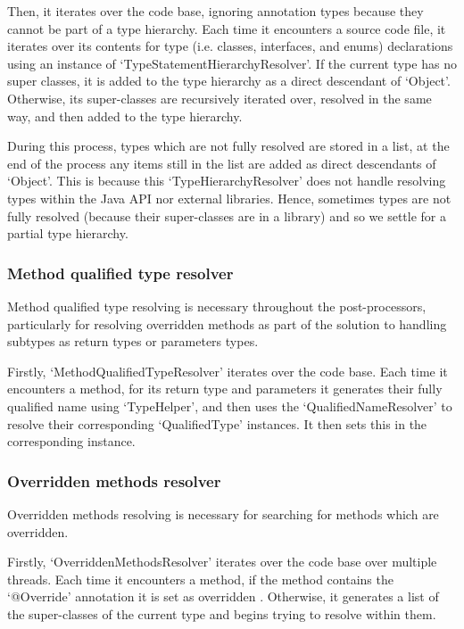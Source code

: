 \documentclass[12pt, letterpaper]{article}
\begin{document}
Then, it iterates over the code base, ignoring annotation types because they cannot be part of a type hierarchy.
Each time it encounters a source code file, it iterates over its contents for type (i.e. classes, interfaces, and enums) declarations using an instance of `TypeStatementHierarchyResolver'.
If the current type has no super classes, it is added to the type hierarchy as a direct descendant of `Object'.
Otherwise, its super-classes are recursively iterated over, resolved in the same way, and then added to the type hierarchy.

During this process, types which are not fully resolved are stored in a list, at the end of the process any items still in the list are added as direct descendants of `Object'.
This is because this `TypeHierarchyResolver' does not handle resolving types within the Java API nor external libraries.
Hence, sometimes types are not fully resolved (because their super-classes are in a library) and so we settle for a partial type hierarchy.

\subsubsection{Method qualified type resolver}
Method qualified type resolving is necessary throughout the post-processors, particularly for resolving overridden methods as part of the solution to handling subtypes as return types or parameters types.

Firstly, `MethodQualifiedTypeResolver' iterates over the code base.
Each time it encounters a method, for its return type and parameters it generates their fully qualified name using `TypeHelper', and then uses the `QualifiedNameResolver' to resolve their corresponding `QualifiedType' instances.
It then sets this in the corresponding instance.

\subsubsection{Overridden methods resolver}
Overridden methods resolving is necessary for searching for methods which are overridden.

Firstly, `OverriddenMethodsResolver' iterates over the code base over multiple threads.
Each time it encounters a method, if the method contains the `@Override' annotation it is set as overridden \autocite{overriddenannotation}.
Otherwise, it generates a list of the super-classes of the current type and begins trying to resolve within them.
\end{document}
